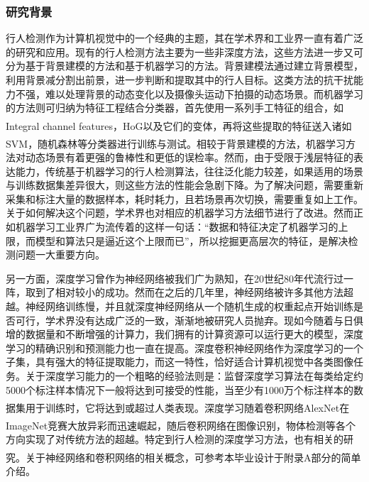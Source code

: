 \documentclass[12pt,a4paper,titlepage]{article}
\newcommand{\upcite}[1]{\textsuperscript{\textsuperscript{\cite{#1}}}}  %
\begin{document}
\subsubsection{研究背景}


行人检测作为计算机视觉中的一个经典的主题，其在学术界和工业界一直有着广泛的研究和应用。现有的行人检测方法主要为一些非深度方法，这些方法进一步又可分为基于背景建模的方法和基于机器学习的方法。背景建模法通过建立背景模型，利用背景减分割出前景，进一步判断和提取其中的行人目标。这类方法的抗干扰能力不强，难以处理背景的动态变化以及摄像头运动下拍摄的动态场景。而机器学习的方法则可归纳为特征工程结合分类器，首先使用一系列手工特征的组合，如Integral channel features\upcite{dollar2009integral}，HoG\upcite{dalal2005histograms}以及它们的变体\upcite{felzenszwalb2010object,schwartz2009human}，再将这些提取的特征送入诸如SVM\upcite{felzenszwalb2010object}，随机森林\upcite{dollar2012crosstalk}等分类器进行训练与测试。相较于背景建模的方法，机器学习方法对动态场景有着更强的鲁棒性和更低的误检率。然而，由于受限于浅层特征的表达能力，传统基于机器学习的行人检测算法，往往泛化能力较差，如果适用的场景与训练数据集差异很大，则这些方法的性能会急剧下降。为了解决问题，需要重新采集和标注大量的数据样本，耗时耗力，且若场景再次切换，需要重复如上工作。关于如何解决这个问题，学术界也对相应的机器学习方法细节进行了改进。然而正如机器学习工业界广为流传着的这样一句话：“数据和特征决定了机器学习的上限，而模型和算法只是逼近这个上限而已”，所以挖掘更高层次的特征，是解决检测问题一大重要方向。\par
另一方面，深度学习曾作为神经网络被我们广为熟知，在20世纪80年代流行过一阵，取到了相对较小的成功。然而在之后的几年里，神经网络被许多其他方法超越。神经网络训练慢，并且就深度神经网络从一个随机生成的权重起点开始训练是否可行，学术界没有达成广泛的一致，渐渐地被研究人员抛弃。现如今随着与日俱增的数据量和不断增强的计算力，我们拥有的计算资源可以运行更大的模型，深度学习的精确识别和预测能力也一直在提高。深度卷积神经网络作为深度学习的一个子集，具有强大的特征提取能力，而这一特性，恰好适合计算机视觉中各类图像任务。关于深度学习能力的一个粗略的经验法则是：监督深度学习算法在每类给定约5000个标注样本情况下一般将达到可接受的性能，当至少有1000万个标注样本的数据集用于训练时，它将达到或超过人类表现\upcite{Goodfellow-et-al-2016}。深度学习随着卷积网络AlexNet\upcite{krizhevsky2012imagenet}在ImageNet竞赛大放异彩而迅速崛起，随后卷积网络在图像识别\upcite{simonyan2014very,he2016deep}，物体检测\upcite{ren15fasterrcnn,redmon2016you,liu2016ssd}等各个方向实现了对传统方法的超越。特定到行人检测的深度学习方法，也有相关的研究\upcite{sermanet2013pedestrian}。关于神经网络和卷积网络的相关概念，可参考本毕业设计于附录A部分的简单介绍。
\end{document}
